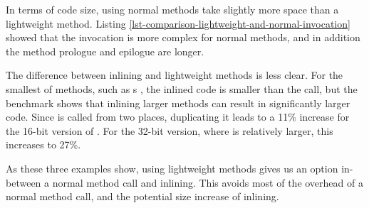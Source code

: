 In terms of code size, using normal methods take slightly more space than a lightweight method. Listing \ref{lst-comparison-lightweight-and-normal-invocation} showed that the invocation is more complex for normal methods, and in addition the method prologue and epilogue are longer.

The difference between inlining and lightweight methods is less clear. For the smallest of methods, such as s , the inlined code is smaller than the call, but the  benchmark shows that inlining larger methods can result in significantly larger code. Since  is called from two places, duplicating it leads to a 11\% increase for the 16-bit version of . For the 32-bit version, where  is relatively larger, this increases to 27\%.

As these three examples show, using lightweight methods gives us an option in-between a normal method call and inlining. This avoids most of the overhead of a normal method call, and the potential size increase of inlining.



